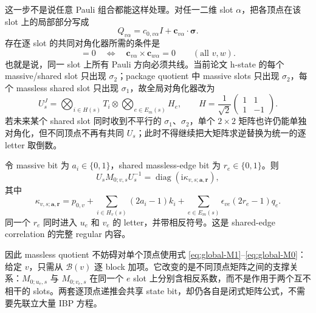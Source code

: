 \documentclass[11pt,a4paper]{ctexart}
\newcommand{\ii}{\mathrm i}
\newcommand{\cB}{\mathcal B}
\begin{document}
这一步不是说任意 Pauli 组合都能这样处理。对任一二维 slot $\alpha$，把各顶点在该 slot 上的局部部分写成
\begin{equation}
 Q_{v\alpha}=c_{0,v\alpha}I+\bm c_{v\alpha}\cdot\bm\sigma.
\end{equation}
存在逐 slot 的共同对角化器所需的条件是
\begin{equation}
 [Q_{v\alpha},Q_{w\alpha}]=0
 \quad\Longleftrightarrow\quad
 \bm c_{v\alpha}\times\bm c_{w\alpha}=0
 \qquad(\text{all }v,w).
 \label{eq:local-common-diagonalization-condition}
\end{equation}
也就是说，同一 slot 上所有 Pauli 方向必须共线。当前论文 h-state 的每个 massive/shared slot 只出现 $\sigma_2$；package quotient 中 massive slots 只出现 $\sigma_2$，每个 massless shared slot 只出现 $\sigma_1$，故全局对角化器改为
\begin{equation}
 U_s^J
 =\bigotimes_{i\in H(s)}T_i
 \otimes\bigotimes_{e\in E_m(s)}H_e,
 \qquad
 H=\frac1{\sqrt2}\begin{pmatrix}1&1\\1&-1\end{pmatrix}.
 \label{eq:package-global-diagonalizer}
\end{equation}
若未来某个 shared slot 同时收到不平行的 $\sigma_1$、$\sigma_2$，单个 $2\times2$ 矩阵也许仍能单独对角化，但不同顶点不再有共同 $U_s$；此时不得继续把大矩阵求逆替换为统一的逐 letter 取倒数。

令 massive bit 为 $a_i\in\{0,1\}$，shared massless-edge bit 为 $r_e\in\{0,1\}$。则
\begin{equation}
 U_sM_{0;v,s}U_s^{-1}
 =\operatorname{diag}\!\left(\ii\kappa_{v,s;\bm a,\bm r}\right),
 \label{eq:global-M0-diagonal}
\end{equation}
其中
\begin{equation}
 \boxed{
 \kappa_{v,s;\bm a,\bm r}
 =p_{0,v}
 +\sum_{i\in H_v(s)}(2a_i-1)k_i
 +\sum_{e\in E_m(s)}
 \epsilon_{ve}(2r_e-1)q_e.
 }
 \label{eq:global-energy-letter}
\end{equation}
同一个 $r_e$ 同时进入 $u_e$ 和 $v_e$ 的 letter，并带相反符号。这是 shared-edge correlation 的完整 regular 内容。

因此 massless quotient 不妨碍对单个顶点使用式 \eqref{eq:global-M1}--\eqref{eq:global-M0}：给定 $v$，只需从 $\cB(v)$ 逐 block 加项。它改变的是不同顶点矩阵之间的支撑关系：$M_{0;u_e,s}$ 与 $M_{0;v_e,s}$ 在同一个 $e$ slot 上分别含相反系数，而不是作用于两个互不相干的 slots。两套逐顶点递推会共享 state bit，却仍各自是闭式矩阵公式，不需要先联立大量 IBP 方程。
\end{document}
